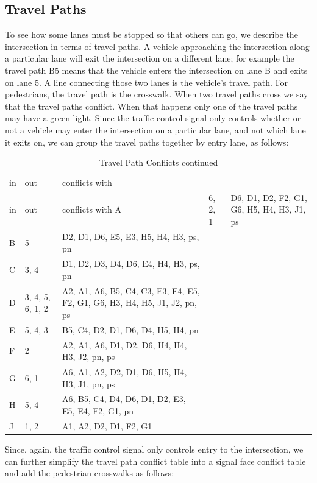 \documentclass[letterpaper,twoside]{article}
\begin{document}
\subsection{Travel Paths}
To see how some lanes must be stopped so that others can go, we describe
the intersection in terms of travel paths.  A vehicle approaching the
intersection along a particular lane will exit the intersection on a
different lane; for example the travel path B5 means that the vehicle enters
the intersection on lane B and exits on lane 5.
A line connecting those two lanes is the vehicle's
travel path.  For pedestrians, the travel path is the crosswalk.
When two travel paths cross we say that the travel paths conflict.
When that happens only one of the travel paths may have a green light.
Since the traffic control signal only controls whether or not a vehicle
may enter the intersection on a particular lane, and not which
lane it exits on, we can group the travel paths together by entry lane, as
follows:

\begin{longtable}{l |l| p{8cm}}
  \caption{Travel Path Conflicts} \\
  in & out & conflicts with \endfirsthead
  \caption{Travel Path Conflicts continued} \\
  in & out & conflicts with \endhead
  \hline
  A & 6, 2, 1 & D6, D1, D2, F2, G1, G6, H5, H4, H3, J1, ps \\
  B & 5 & D2, D1, D6, E5, E3, H5, H4, H3, ps, pn \\
  C & 3, 4 & D1, D2, D3, D4, D6, E4, H4, H3, ps, pn \\
  D & 3, 4, 5, 6, 1, 2 & A2, A1, A6, B5, C4, C3, E3, E4, E5, F2, G1, G6, H3,
  H4, H5, J1, J2, pn, ps \\
  E & 5, 4, 3 & B5, C4, D2, D1, D6, D4, H5, H4, pn \\
  F & 2 & A2, A1, A6, D1, D2, D6, H4, H4, H3, J2, pn, ps \\
  G & 6, 1 & A6, A1, A2, D2, D1, D6, H5, H4, H3, J1, pn, ps \\
  H & 5, 4 & A6, B5, C4, D4, D6, D1, D2, E3, E5, E4, F2, G1, pn \\
  J & 1, 2 & A1, A2, D2, D1, F2, G1 \\
\end{longtable}

Since, again, the traffic control signal only controls entry to the
intersection,
we can further simplify the travel path conflict table into a signal face
conflict table and add the pedestrian crosswalks as follows:
\end{document}
